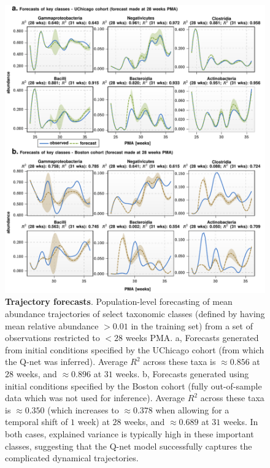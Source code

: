 \documentclass[onecolumn,10pt]{IEEEtran}
\newcommand{\captionN}[1]{\caption{\color{darkgray} \sffamily \fontsize{9}{10}\selectfont #1  }}
\def\qnet{Q-net\xspace}
\begin{document}
\begin{figure}[!ht]   
\centering 
\includegraphics[width=.975\textwidth]{fig2.pdf}
\captionN{\textbf{Trajectory forecasts}. Population-level forecasting of mean abundance trajectories of select taxonomic classes (defined by having mean relative abundance $> 0.01$ in the training set) from a set of observations restricted to $<28$ weeks PMA. a, Forecasts generated from initial conditions specified by the UChicago cohort (from which the \qnet was inferred). Average $R^2$ across these taxa is $\approx 0.856$ at $28$ weeks, and $\approx 0.896$ at $31$ weeks. b, Forecasts generated using initial conditions specified by the Boston cohort (fully out-of-sample data which was not used for inference).  Average $R^2$ across these taxa is $\approx 0.350$ (which increases to $\approx 0.378$ when allowing for a temporal shift of $1$ week) at $28$ weeks, and $\approx 0.689$ at $31$ weeks.  In both cases, explained variance is typically high in these important classes, suggesting that the \qnet model successfully captures the complicated dynamical trajectories.   }\label{fig:forecast}
\end{figure}
\end{document}
